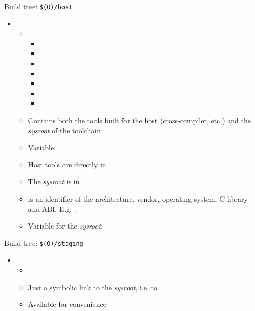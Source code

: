 \begin{frame}{Build tree: {\tt \$(O)/host}}
  \begin{itemize}
  \item {}
    \begin{itemize}
    \item {}
      \begin{itemize}
        \tiny
      \item {}
      \item {}
      \item {}
        \vspace{0.2cm}
      \item {}
      \item {}
      \item {}
      \item {}
      \end{itemize}
    \item Contains both the tools built for the host
      (cross-compiler, etc.) and the {\em sysroot} of the toolchain
    \item Variable: 
    \item Host tools are directly in 
    \item The {\em sysroot} is in 
    \item {} is an identifier of the architecture, vendor,
      operating system, C library and ABI. E.g:
      .
    \item Variable for the {\em sysroot}: 
    \end{itemize}
  \end{itemize}
\end{frame}

\begin{frame}{Build tree: {\tt \$(O)/staging}}
  \begin{itemize}
  \item {}
    \begin{itemize}
    \item {}
    \item Just a symbolic link to the {\em sysroot}, i.e. to
      .
    \item Available for convenience
    \end{itemize}
  \end{itemize}
\end{frame}

